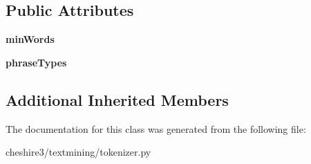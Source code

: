 \subsection*{Public Attributes}
\begin{DoxyCompactItemize}
\item 
\hypertarget{classcheshire3_1_1textmining_1_1tokenizer_1_1_phrase_unparsed_genia_tokenizer_aaef099095812eb7822af67119dac647b}{{\bfseries min\-Words}}\label{classcheshire3_1_1textmining_1_1tokenizer_1_1_phrase_unparsed_genia_tokenizer_aaef099095812eb7822af67119dac647b}

\item 
\hypertarget{classcheshire3_1_1textmining_1_1tokenizer_1_1_phrase_unparsed_genia_tokenizer_a83bd90e64fed411dd35ae732eef907b3}{{\bfseries phrase\-Types}}\label{classcheshire3_1_1textmining_1_1tokenizer_1_1_phrase_unparsed_genia_tokenizer_a83bd90e64fed411dd35ae732eef907b3}

\end{DoxyCompactItemize}
\subsection*{Additional Inherited Members}


The documentation for this class was generated from the following file\-:\begin{DoxyCompactItemize}
\item 
cheshire3/textmining/tokenizer.\-py\end{DoxyCompactItemize}
